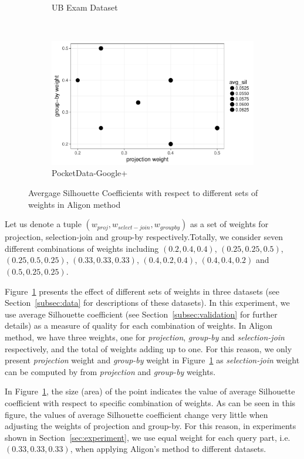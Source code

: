 \begin{figure}[h!]
\begin{subfigure}[b]{0.322\textwidth}
        \caption{UB Exam Dataset}
    \end{subfigure}
    ~
    \begin{subfigure}[b]{0.322\textwidth}%
        \centering
        \includegraphics[width=\textwidth]{graphics/aligon_weight_googleplus}
        \caption{PocketData-Google+}
    \end{subfigure}
    \caption{Avergage Silhouette Coefficients with respect to different sets of weights in Aligon method}
    \label{fig:aligon_weight}
\end{figure}

Let us denote a tuple $(w_{proj}, w_{select-join}, w_{groupby})$ as a set of weights for projection, selection-join and group-by respectively.Totally, we consider seven different combinations of weights including $(0.2, 0.4, 0.4)$, $(0.25, 0.25, 0.5)$, $(0.25, 0.5, 0.25)$, $(0.33, 0.33, 0.33)$, $(0.4, 0.2, 0.4)$, $(0.4, 0.4, 0.2)$ and $(0.5, 0.25, 0.25)$. 

Figure~\ref{fig:aligon_weight} presents the effect of different sets of weights in three datasets (see Section~\ref{subsec:data} for descriptions of these datasets). In this experiment, we use average Silhouette coefficient (see Section~\ref{subsec:validation} for further details) as a measure of quality for each combination of weights. In Aligon method, we have three weights, one for \textit{projection}, \textit{group-by} and \textit{selection-join} respectively, and the total of weights adding up to one. For this reason, we only present \textit{projection} weight and \textit{group-by} weight in Figure~\ref{fig:aligon_weight} as \textit{selection-join} weight can be computed by from \textit{projection} and \textit{group-by} weights. 

In Figure~\ref{fig:aligon_weight}, the size (area) of the point indicates the value of average Silhouette coefficient with respect to specific combination of weights. As can be seen in this figure, the values of average Silhouette coefficient change very little when adjusting the weights of projection and group-by. For this reason, in experiments shown in Section~\ref{sec:experiment}, we use equal weight for each query part, i.e. $(0.33, 0.33, 0.33)$, when applying Aligon's method to different datasets.

